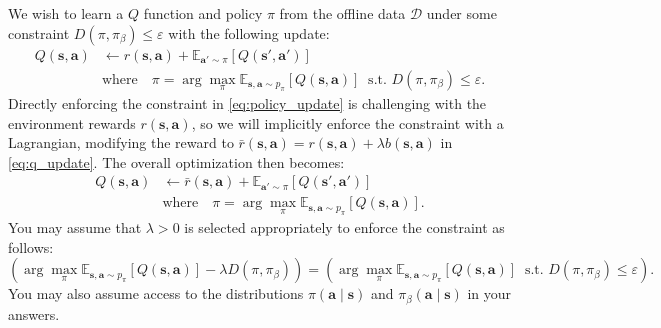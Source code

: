 \documentclass{article}
\def\D{\mathcal{D}}
\def\s{\mathbf{s}}
\def\a{\mathbf{a}}
\def\E{\mathbb{E}}
\def\pib{\pi_{\beta}}
\begin{document}
We wish to learn a $Q$ function and policy $\pi$ from the offline data $\D$ under some constraint $D(\pi,\pib)\leq\varepsilon$ with the following update:\begin{align}
   Q(\s,\a) &\gets {r}(\s,\a)+\E_{\a' \sim \pi}\left[Q\left(\s',\a'\right)\right] \label{eq:q_update}\\
   \quad &\text{where}\quad \pi=\arg\max_\pi \E_{\s,\a\sim p_\pi} [Q(\s,\a)]\ \text{ s.t. } D(\pi,\pib)\leq\varepsilon. \label{eq:policy_update}
\end{align}
Directly enforcing the constraint in \eqref{eq:policy_update} is challenging with the environment rewards $r(\s,\a)$, so we will implicitly enforce the constraint with a Lagrangian, modifying the reward to $\bar r(\s,\a)=r(\s,\a)+\lambda b(\s,\a)$ in \eqref{eq:q_update}. The overall optimization then becomes:
\begin{align}
   Q(\s,\a) &\gets \bar{r}(\s,\a)+\E_{\a' \sim \pi}\left[Q\left(\s',\a'\right)\right] \\
   \quad &\text{where}\quad \pi=\arg\max_\pi \E_{\s,\a\sim p_\pi} [Q(\s,\a)].
\end{align}
You may assume that $\lambda>0$ is selected appropriately to enforce the constraint as follows: $$\left(\arg\max_\pi \E_{\s,\a\sim p_\pi} [Q(\s,\a)]-\lambda D(\pi,\pi_\beta)\right)=\left(\arg\max_\pi \E_{\s,\a\sim p_\pi} [Q(\s,\a)]\ \text{ s.t. } D(\pi,\pib)\leq\varepsilon\right).$$
You may also assume access to the distributions $\pi(\a\mid\s)$ and $\pib(\a\mid\s)$ in your answers.
\end{document}
